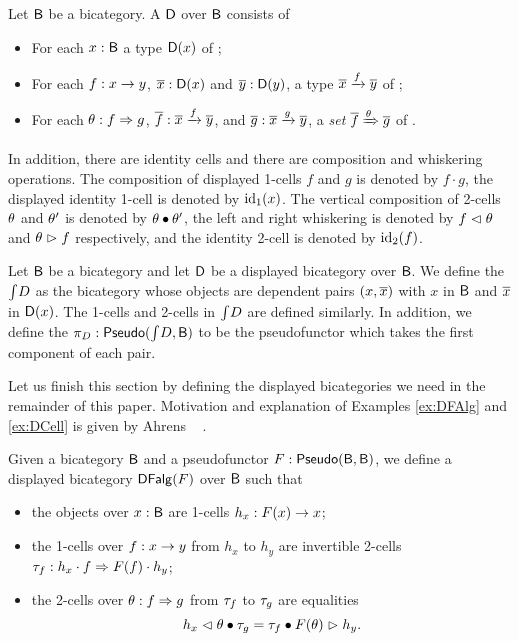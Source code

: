 \begin{definition}
Let $\mathsf{B}$ be a bicategory.
A  $\mathsf{D}$ over $\mathsf{B}$ consists of
\begin{itemize}
	\item For each $x : \mathsf{B}$ a type ${\mathsf{D}}(x)$ of ;
	\item For each $f : x \rightarrow y$, $\overline{x} : {\mathsf{D}}(x)$ and $\overline{y} : {\mathsf{D}}(y)$,
	a type $\overline{x} \xrightarrow{f} \overline{y}$ of ;
	\item For each $\theta : f \Rightarrow g$, $\overline{f} : \overline{x} \xrightarrow{f} \overline{y}$, and $\overline{g} : \overline{x} \xrightarrow{g} \overline{y}$, a \emph{set} $\overline{f} \xRightarrow{\theta} \overline{g}$ of .
\end{itemize}
In addition, there are identity cells and there are composition and whiskering operations.
The composition of displayed 1-cells $f$ and $g$ is denoted by $f \cdot g$, the displayed identity 1-cell is denoted by $\operatorname{id}_1(x)$.
The vertical composition of 2-cells $\theta$ and $\theta'$ is denoted by $\theta \bullet \theta'$, the left and right whiskering is denoted by $f \vartriangleleft \theta$ and $\theta \vartriangleright f$ respectively,
and the identity 2-cell is denoted by $\operatorname{id}_2(f)$. 
\end{definition}

\begin{definition}
\label{def:totalbicat}
Let $\mathsf{B}$ be a bicategory and let $\mathsf{D}$ be a displayed bicategory over $\mathsf{B}$.
We define the  $\textstyle \int_{}{D}$ as the bicategory whose objects are dependent pairs $(x, \overline{x})$ with $x$ in $\mathsf{B}$ and $\overline{x}$ in ${\mathsf{D}}(x)$.
The 1-cells and 2-cells in $\textstyle \int_{}{D}$ are defined similarly.
In addition, we define the  $\pi_{D} : \mathsf{Pseudo}(\textstyle \int_{}{D}, \mathsf{B})$ to be the pseudofunctor which takes the first component of each pair.
\end{definition}

Let us finish this section by defining the displayed bicategories we need in the remainder of this paper.
Motivation and explanation of Examples \ref{ex:DFAlg} and \ref{ex:DCell} is given by Ahrens \etal ~ \cite{bicatjournal}.

\begin{example}
\label{ex:DFAlg}
Given a bicategory $\mathsf{B}$ and a pseudofunctor $F : \mathsf{Pseudo}(\mathsf{B}, \mathsf{B})$,
we define a displayed bicategory $\mathsf{DFalg}(F)$ over $\mathsf{B}$ such that
\begin{itemize}
	\item the objects over $x : \mathsf{B}$ are 1-cells $h_x : F(x) \rightarrow x$;
	\item the 1-cells over $f : x \rightarrow y$ from $h_x$ to $h_y$ are invertible 2-cells $\tau_f : h_x \cdot f \Rightarrow F(f) \cdot h_y$;
	\item the 2-cells over $\theta : f \Rightarrow g$ from $\tau_f$ to $\tau_g$ are equalities
	\begin{equation*}\label{eq:twocell_alg}
	h_x \vartriangleleft \theta \bullet \tau_g = \tau_f \bullet F(\theta) \vartriangleright h_y.
	\end{equation*}
\end{itemize}
\end{example}

